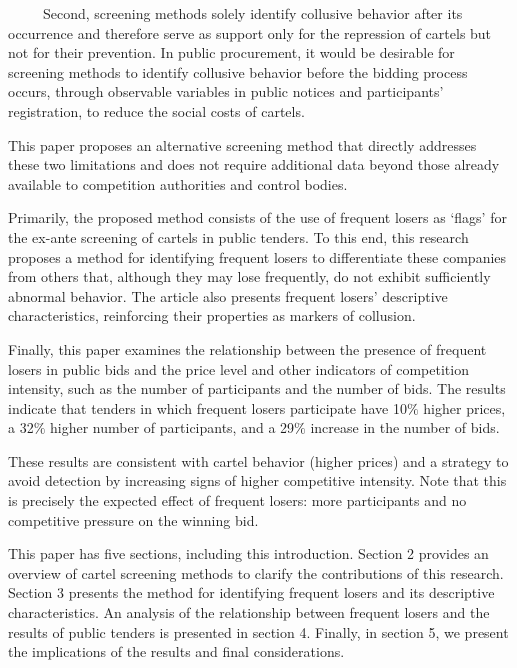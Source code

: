 \documentclass[10pt]{article}
\begin{document}
\ \ \ \ \ Second, screening methods solely identify collusive behavior after its occurrence and therefore serve as support only for the repression of cartels but not for their prevention. In public procurement, it would be desirable for screening methods to identify collusive behavior before the bidding process occurs, through observable variables in public notices and participants’ registration, to reduce the social costs of cartels.

This paper proposes an alternative screening method that directly addresses these two limitations and does not require additional data beyond those already available to competition authorities and control bodies.

Primarily, the proposed method consists of the use of frequent losers as ‘flags’ for the ex-ante screening of cartels in public tenders. To this end, this research proposes a method for identifying frequent losers to differentiate these companies from others that, although they may lose frequently, do not exhibit sufficiently abnormal behavior. The article also presents frequent losers’ descriptive characteristics, reinforcing their properties as markers of collusion.

Finally, this paper examines the relationship between the presence of frequent losers in public bids and the price level and other indicators of competition intensity, such as the number of participants and the number of bids. The results indicate that tenders in which frequent losers participate have 10$\%$ higher prices, a 32$\%$ higher number of participants, and a 29$\%$ increase in the number of bids.

These results are consistent with cartel behavior (higher prices) and a strategy to avoid detection by increasing signs of higher competitive intensity. Note that this is precisely the expected effect of frequent losers: more participants and no competitive pressure on the winning bid.

This paper has five sections, including this introduction. Section 2 provides an overview of cartel screening methods to clarify the contributions of this research. Section 3 presents the method for identifying frequent losers and its descriptive characteristics. An analysis of the relationship between frequent losers and the results of public tenders is presented in section 4. Finally, in section 5, we present the implications of the results and final considerations.

\vspace{1\baselineskip}
\end{document}
